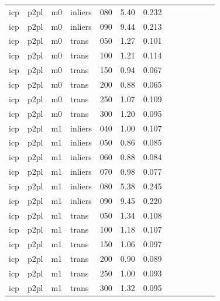 \begin{table}[htbp]
\begin{tabular}{lllllrrrrrrrr}
  icp & p2pl & m0 & inliers & 080 & 5.40 & 0.232 \\
  icp & p2pl & m0 & inliers & 090 & 9.44 & 0.213 \\
  icp & p2pl & m0 & trans & 050 & 1.27 & 0.101 \\
  icp & p2pl & m0 & trans & 100 & 1.21 & 0.114 \\
  icp & p2pl & m0 & trans & 150 & 0.94 & 0.067 \\
  icp & p2pl & m0 & trans & 200 & 0.88 & 0.065 \\
  icp & p2pl & m0 & trans & 250 & 1.07 & 0.109 \\
  icp & p2pl & m0 & trans & 300 & 1.20 & 0.095 \\
  icp & p2pl & m1 & inliers & 040 & 1.00 & 0.107 \\
  icp & p2pl & m1 & inliers & 050 & 0.86 & 0.085 \\
  icp & p2pl & m1 & inliers & 060 & 0.88 & 0.084 \\
  icp & p2pl & m1 & inliers & 070 & 0.98 & 0.077 \\
  icp & p2pl & m1 & inliers & 080 & 5.38 & 0.245 \\
  icp & p2pl & m1 & inliers & 090 & 9.45 & 0.220 \\
  icp & p2pl & m1 & trans & 050 & 1.34 & 0.108 \\
  icp & p2pl & m1 & trans & 100 & 1.18 & 0.107 \\
  icp & p2pl & m1 & trans & 150 & 1.06 & 0.097 \\
  icp & p2pl & m1 & trans & 200 & 0.90 & 0.089 \\
  icp & p2pl & m1 & trans & 250 & 1.00 & 0.093 \\
  icp & p2pl & m1 & trans & 300 & 1.32 & 0.095 \\
\bottomrule
\end{tabular}
\end{table}
